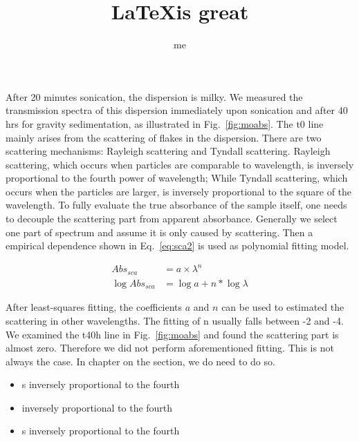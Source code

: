 \documentclass[12pt,oneside]{book}
\begin{document}
  \title{\LaTeX is great}
  \author{me}
  \maketitle

    \clearpage
    \tableofcontents
    \clearpage
    \listoftables
    \clearpage
    \listoffigures

    \begin{singlespace}
    \renewcommand{\glossarypreamble}{\thispagestyle{myheadings}} %
    \printglossary[type=\acronymtype]
    \clearpage
    \end{singlespace}


After 20 minutes sonication, the dispersion is milky. We measured the transmission spectra of this dispersion immediately upon sonication and after 40 hrs for gravity sedimentation, as illustrated in Fig.~\ref{fig:moabs}. The t0 line mainly arises from the scattering of flakes in the dispersion. There are two scattering mechanisms: Rayleigh scattering and Tyndall scattering. Rayleigh scattering, which occurs when particles are comparable to wavelength, is inversely proportional to the fourth power of wavelength; While Tyndall scattering, which occurs when the particles are larger, is inversely proportional to the square of the wavelength. To fully evaluate the true absorbance of the sample itself, one needs to decouple the scattering part from apparent absorbance. Generally we select one part of spectrum and assume it is only caused by scattering. Then a empirical dependence shown in Eq.~\ref{eq:sca2} is used as polynomial fitting model.

\begin{align}
Abs_{sca}  & = a\times \lambda^{n}  \label{eq:sca1}\\
\log{Abs_{sca}} & = \log{a} + n*\log{\lambda} \label{eq:sca2}
\end{align}

After least-squares fitting, the coefficients $a$ and $n$ can be used to estimated the scattering in other wavelengths. The fitting of n usually falls between -2 and -4. We examined the t40h line in Fig.~\ref{fig:moabs} and found the scattering part is almost zero. Therefore we did not perform aforementioned fitting. This is not always the case. In chapter on the  section, we do need to do so.

\begin{itemize}
\item s inversely proportional to the fourth
\item  inversely proportional to the fourth
\item s inversely proportional to the fourth
\end{itemize}
\end{document}
